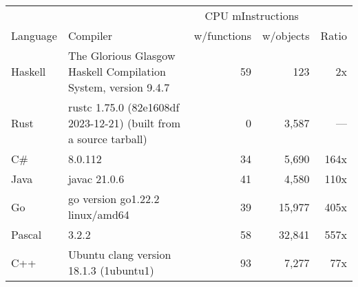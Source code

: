 \documentclass{article}
\begin{document}
      \begin{tabularx}{\linewidth}{lXrrr}
      \toprule
        & & \multicolumn{2}{c}{CPU mInstructions} & \\
        Language & Compiler & w/functions & w/objects & Ratio \\
      \midrule
    Haskell & The Glorious Glasgow Haskell Compilation System, version 9.4.7 & 59 & 123 & 2x \\
Rust & rustc 1.75.0 (82e1608df 2023-12-21) (built from a source tarball) & 0 & 3,587 & --- \\
C\# & 8.0.112 & 34 & 5,690 & 164x \\
Java & javac 21.0.6 & 41 & 4,580 & 110x \\
Go & go version go1.22.2 linux/amd64 & 39 & 15,977 & 405x \\
Pascal & 3.2.2 & 58 & 32,841 & 557x \\
C++ & Ubuntu clang version 18.1.3 (1ubuntu1) & 93 & 7,277 & 77x \\

      \bottomrule
      \end{tabularx}
      
\end{document}
